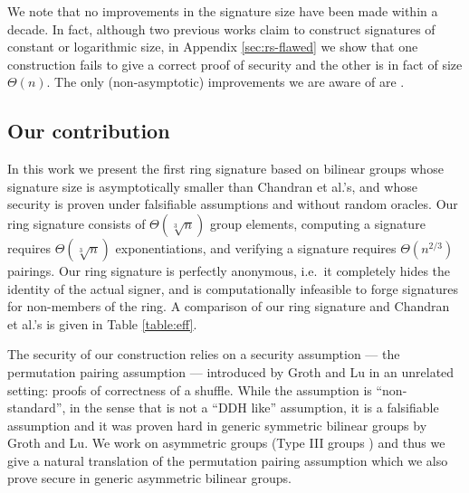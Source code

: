 We note that no improvements in the
signature size have been made within a decade. In fact, although two previous works claim to construct signatures of constant \cite{ACISP:BosDasRan15} or logarithmic \cite{IET:GriSusPla16} size, in Appendix \ref{sec:rs-flawed} we show that one construction fails to give a correct proof of security and the other is in fact of size $\Theta(n)$. The only (non-asymptotic) improvements we are aware of are \cite{TCC:Rafols15,AC:GonHevRaf15}.

\subsection{Our contribution}
In this work we present the first ring signature based on bilinear groups whose signature size is asymptotically smaller than Chandran et al.'s, and whose security is proven under falsifiable assumptions and without random oracles. Our ring signature consists of $\Theta(\sqrt[3]{n})$ group elements, computing a signature requires $\Theta(\sqrt[3]{n})$ exponentiations, and verifying a signature requires $\Theta(n^{2/3})$ pairings. Our ring signature is perfectly anonymous, i.e.~it completely hides the identity of the actual signer, and is computationally infeasible to forge signatures for non-members of the ring. A comparison of our ring signature and Chandran et al.'s is given in Table \ref{table:eff}.

The security of our construction relies on a security assumption --- the {permutation pairing assumption} --- introduced by Groth and Lu \cite{AC:GroLu07} in an unrelated setting: proofs of correctness of a shuffle. While the assumption is ``non-standard'', in the sense that is not a ``DDH like'' assumption, it is a falsifiable assumption and it was proven hard in generic symmetric bilinear groups by Groth and Lu. We work on asymmetric groups (Type III groups \cite{EPRINT:GalPatSma06}) and thus we give a natural translation of the permutation pairing assumption which we also prove secure in generic asymmetric bilinear groups.

 
